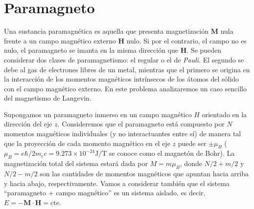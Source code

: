 \documentclass[a4paper,11pt]{article}
\begin{document}
\section{Paramagneto}

Una sustancia paramagnética es aquella que presenta magnetización 
$\mathbf{M}$ nula frente a un campo magnético externo $\mathbf{H}$ 
nulo.
Si por el contrario, el campo no es nulo, el paramagneto se imanta en 
la misma dirección que $\mathbf{H}$. Se pueden considerar dos clases de 
paramagnetismo: el regular o el de \emph{Pauli}.
El segundo se debe al gas de electrones libres de un metal, mientras 
que el primero se origina en la interacción de los momentos magnéticos 
intrínsecos de los átomos del sólido con el campo magnético externo.
En este problema analizaremos un caso sencillo del magnetismo de 
Langevin.

Supongamos un paramagneto inmerso en un campo magnético $H$ 
orientado en la dirección del eje $z$.
Consideremos que el paramagneto está compuesto por $N$ momentos 
magnéticos individuales (y no interactuantes entre sí) de manera tal 
que la proyección de cada momento magnético en el eje $z$ 
puede ser $\pm \mu_B$ ($\mu_B = e\hbar / 2m_e c = 9.273 \times 
10^{-24} \text{J/T}$ se conoce como el magnetón de Bohr).
La magnetización total del sistema estará dada por $M = m \mu_B$, donde 
$N/2 + m/2$ y $N/2 - m/2$ son las cantidades de momentos magnéticos que 
apuntan hacia arriba y hacia abajo, respectivamente.
Vamos a considerar también que el sistema ``paramagneto + campo 
magnético'' es un sistema aislado, es decir, $E = - 
\mathbf{M}\cdot\mathbf{H} = \text{cte}$.
\end{document}
